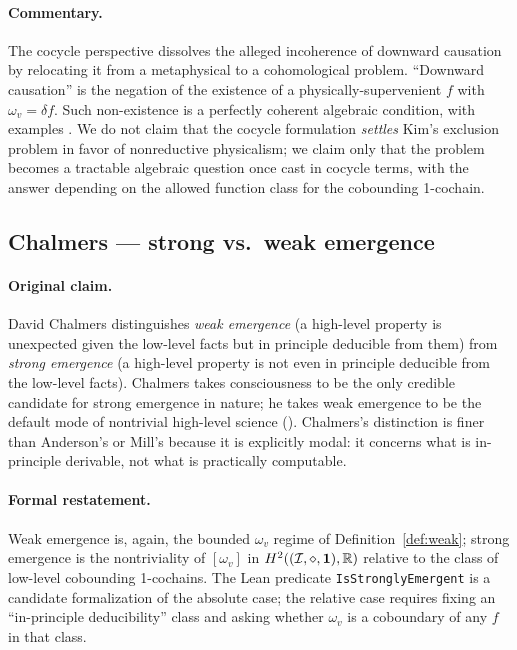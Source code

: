 \paragraph{Commentary.} The cocycle perspective dissolves the alleged
incoherence of downward causation by relocating it from a metaphysical to a
cohomological problem. ``Downward causation'' is the negation of the
existence of a physically-supervenient $f$ with $\omega_v = \delta f$. Such
non-existence is a perfectly coherent algebraic condition, with examples
\cite{Bedau1997, Anderson1972}. We do not claim that the cocycle
formulation \emph{settles} Kim's exclusion problem in favor of nonreductive
physicalism; we claim only that the problem becomes a tractable algebraic
question once cast in cocycle terms, with the answer depending on the
allowed function class for the cobounding 1-cochain.

\subsection{Chalmers --- strong vs.\ weak emergence}\label{sec:zoo:chalmers}

\paragraph{Original claim.} David Chalmers \cite{ChalmersStrong} distinguishes
\emph{weak emergence} (a high-level property is unexpected given the
low-level facts but in principle deducible from them) from \emph{strong
emergence} (a high-level property is not even in principle deducible from
the low-level facts). Chalmers takes consciousness to be the only credible
candidate for strong emergence in nature; he takes weak emergence to be the
default mode of nontrivial high-level science (\cite{Bedau1997, Holland1998}).
Chalmers's distinction is finer than Anderson's or Mill's because it is
explicitly modal: it concerns what is in-principle derivable, not what is
practically computable.

\paragraph{Formal restatement.} Weak emergence is, again, the bounded
$\omega_v$ regime of Definition~\ref{def:weak}; strong emergence is the
nontriviality of $[\omega_v]$ in $H^2((\mathcal{I},\mathbin{\diamond},\mathbf{1}), \mathbb{R})$ relative to the
class of low-level cobounding 1-cochains. The Lean predicate
\texttt{IsStronglyEmergent} is a candidate formalization of the absolute
case; the relative case requires fixing an ``in-principle deducibility''
class and asking whether $\omega_v$ is a coboundary of any $f$ in that
class.

